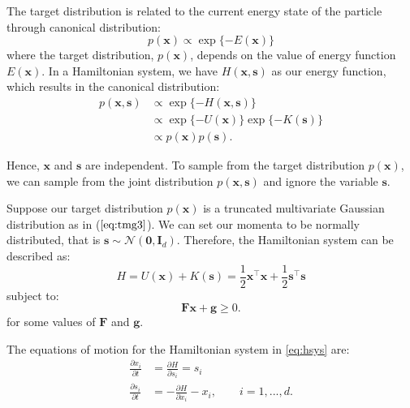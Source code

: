 \documentclass{scrartcl}
\numberwithin{equation}{section}
\begin{document}
The target distribution is related to the current energy state of the particle through canonical distribution:
\begin{equation}\label{eq:can}
	p(\textbf{x}) \propto \exp\{-E(\textbf{x})\}
\end{equation}
where the target distribution, $p(\textbf{x})$, depends on the value of energy function $E(\textbf{x})$. In a Hamiltonian system, we have $H(\textbf{x}, \textbf{s})$ as our energy function, which results in the canonical distribution:
\begin{equation}\label{eq:can2}
\begin{split}
	p(\textbf{x}, \textbf{s}) &\propto \exp\{-H(\textbf{x}, \textbf{s})\} \\
	&\propto \exp\{-U(\textbf{x})\} \exp\{-K(\textbf{s})\} \\
	&\propto p(\textbf{x})p(\textbf{s}).
\end{split}
\end{equation}

Hence, $\textbf{x}$ and $\textbf{s}$ are independent. To sample from the target distribution $p(\textbf{x})$, we can sample from the joint distribution $p(\textbf{x}, \textbf{s})$ and ignore the variable $\textbf{s}$.  

Suppose our target distribution $p(\textbf{x})$ is a truncated multivariate Gaussian distribution as in ($\ref{eq:tmg3}$). We can set our momenta to be normally distributed, that is $\textbf{s} \sim \mathcal{N}(\textbf{0}, \textbf{I}_d)$. Therefore, the Hamiltonian system can be described as: 
\begin{equation}\label{eq:hsys}
	H = U(\textbf{x}) + K(\textbf{s}) = \frac{1}{2}\textbf{x}^{\intercal}\textbf{x} + \frac{1}{2}\textbf{s}^{\intercal}\textbf{s}
\end{equation}
subject to:  
\begin{equation}\label{eq:st}
	\textbf{F}\textbf{x} + \textbf{g} \geq 0.
\end{equation}
for some values of $\textbf{F}$ and $\textbf{g}$.   

The equations of motion for the Hamiltonian system in \eqref{eq:hsys} are:    
\begin{equation}\label{eq:heqs2}
\begin{split}
	\frac{\partial x_i}{\partial t} & = \frac{\partial H}{\partial s_i} = s_i \\
	\frac{\partial s_i}{\partial t} & = -\frac{\partial H}{\partial x_i} -x_i, \qquad i=1,...,d.\\
\end{split}
\end{equation}
\end{document}
